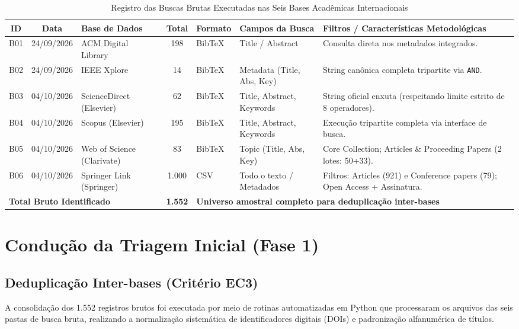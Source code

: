 \documentclass[journal,10pt,a4paper]{IEEEtran}
\begin{document}
\begin{table}[t]
\caption{Registro das Buscas Brutas Executadas nas Seis Bases Acadêmicas Internacionais}
\label{tab:buscas_executadas}
\centering
\footnotesize
\begin{tabularx}{\textwidth}{cclcllX}
\toprule
\textbf{ID} & \textbf{Data} & \textbf{Base de Dados} & \textbf{Total} & \textbf{Formato} & \textbf{Campos da Busca} & \textbf{Filtros / Características Metodológicas} \\
\midrule
B01 & 24/09/2026 & ACM Digital Library & 198 & BibTeX & Title / Abstract & Consulta direta nos metadados integrados. \\
B02 & 24/09/2026 & IEEE Xplore & 14 & BibTeX & Metadata (Title, Abs, Key) & String canônica completa tripartite via \texttt{AND}. \\
B03 & 04/10/2026 & ScienceDirect (Elsevier) & 62 & BibTeX & Title, Abstract, Keywords & String oficial enxuta (respeitando limite estrito de 8 operadores). \\
B04 & 04/10/2026 & Scopus (Elsevier) & 195 & BibTeX & Title, Abstract, Keywords & Execução tripartite completa via interface de busca. \\
B05 & 04/10/2026 & Web of Science (Clarivate) & 83 & BibTeX & Topic (Title, Abs, Key) & Core Collection; Articles \& Proceeding Papers (2 lotes: 50+33). \\
B06 & 04/10/2026 & Springer Link (Springer) & 1.000 & CSV & Todo o texto / Metadados & Filtros: Articles (921) e Conference papers (79); Open Access + Assinatura. \\
\midrule
\multicolumn{3}{l}{\textbf{Total Bruto Identificado}} & \textbf{1.552} & \multicolumn{3}{l}{\textbf{Universo amostral completo para deduplicação inter-bases}} \\
\bottomrule
\end{tabularx}
\end{table}

\section{Condução da Triagem Inicial (Fase 1)}

\subsection{Deduplicação Inter-bases (Critério EC3)}
A consolidação dos 1.552 registros brutos foi executada por meio de rotinas automatizadas em Python que processaram os arquivos das seis pastas de busca bruta, realizando a normalização sistemática de identificadores digitais (DOIs) e padronização alfanumérica de títulos. 
\end{document}
